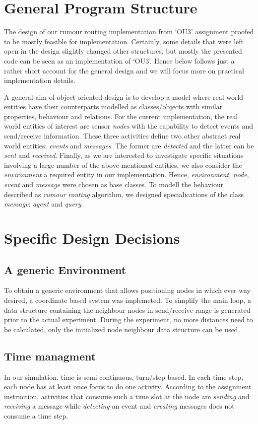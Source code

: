 \documentclass[a4paper,11pt,twoside]{article}
\begin{document}
\section{General Program Structure}
The design of our rumour routing implementation from `OU3' assignment
proofed to be mostly feasible for implementation. Certainly, some
details that were left open in the design slightly changed other
structures, but mostly the presented code can be seen as
an implementation of `OU3'. Hence below follows just a rather short
account for the general design and we will focus more on practical
implementation details.

A general aim of object oriented design is to develop a model where
real world entities have their counterparts modelled as classes/objects
with similar properties, behaviour and relations. For the current
implementation, the real world entities of interest are sensor
\textit{nodes} with the capability to detect events and send/receive
information. These three activities define two other abstract real
world entities: \textit{events} and \textit{messages}. The former are
\textit{detected} and the latter can be \textit{sent} and \textit{received}. 
Finally, as we are interested to investigate specific
situations involving a large number of the above mentioned entities,
we also consider the \textit{environment} a required entity in our
implementation. Hence, \textit{environment}, \textit{node},
\textit{event} and \textit{message} were chosen as base
classes. To modell the behaviour described as \textit{rumour routing}
algorithm, we designed specialications of the class \textit{message}:
\textit{agent} and \textit{query}.

\section{Specific Design Decisions}
\subsection{A generic Environment}
To obtain a generic environment that allows positioning nodes in which
ever way desired, a coordinate based system was implemeted. To
simplify the main loop, a data structure containing the
neighbour nodes in send/receive range is generated prior to the actual
experiment. During the experiment, no more distances need to be
calculated, only the initialized node neighbour data structure can be
used.

\subsection{Time managment}
In our simulation, time is semi continuous, turn/step based. 
In each time step, each node has at least once focus to
do one activity. According to the assignment instruction, activities
that consume such a time slot at the node are \textit{sending} and
\textit{receiving} a message while \textit{detecting} an event and
\textit{creating} messages does not consume a time step. 
\end{document}
